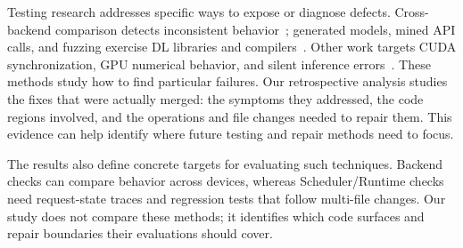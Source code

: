 Testing research addresses specific ways to expose or diagnose defects. Cross-backend comparison detects inconsistent behavior~\cite{pham2019cradle}; generated models, mined API calls, and fuzzing exercise DL libraries and compilers~\cite{wang2020lemon,wei2022freefuzz,gu2022muffin,li2023comet,guo2020audee,liu2023nnsmith,deng2023titanfuzz}. Other work targets CUDA synchronization, GPU numerical behavior, and silent inference errors~\cite{wu2020simulee,rathnasuriya2025gpunumerical,gu2026ekka}. These methods study how to find particular failures. Our retrospective analysis studies the fixes that were actually merged: the symptoms they addressed, the code regions involved, and the operations and file changes needed to repair them. This evidence can help identify where future testing and repair methods need to focus.

The results also define concrete targets for evaluating such techniques. Backend checks can compare behavior across devices, whereas Scheduler/Runtime checks need request-state traces and regression tests that follow multi-file changes. Our study does not compare these methods; it identifies which code surfaces and repair boundaries their evaluations should cover.
 
